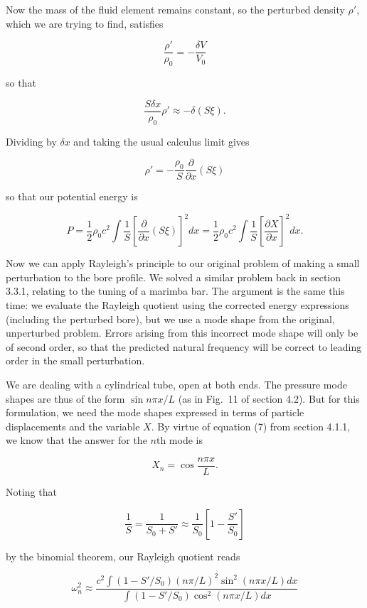   Now the mass of the fluid element remains constant, so the perturbed density 
  $\rho'$, which we are trying to find, satisfies 

  $$\dfrac{\rho'}{\rho_0}=-\dfrac{\delta V}{V_0} \tag{6}$$ 

  so that 

  $$\dfrac{S \delta x}{\rho_0}\rho' \approx -\delta(S \xi) . \tag{7}$$ 

  Dividing by $\delta x$ and taking the usual calculus limit gives 

  $$\rho'=-\dfrac{\rho_0}{S}\dfrac{\partial}{\partial x}(S \xi) \tag{8}$$ 

  so that our potential energy is 

  $$P=\dfrac{1}{2} \rho_0 c^2 \int{\dfrac{1}{S}\left[\dfrac{\partial}{\partial 
  x}(S \xi)\right]^2 dx}=\dfrac{1}{2} \rho_0 c^2 
  \int{\dfrac{1}{S}\left[\dfrac{\partial X}{\partial x}\right]^2 dx} . 
  \tag{9}$$ 

  Now we can apply Rayleigh's principle to our original problem of making a 
  small perturbation to the bore profile. We solved a similar problem back in 
  section 3.3.1, relating to the tuning of a marimba bar. The argument is the 
  same this time: we evaluate the Rayleigh quotient using the corrected energy 
  expressions (including the perturbed bore), but we use a mode shape from the 
  original, unperturbed problem. Errors arising from this incorrect mode shape 
  will only be of second order, so that the predicted natural frequency will be 
  correct to leading order in the small perturbation. 

  We are dealing with a cylindrical tube, open at both ends. The pressure mode 
  shapes are thus of the form $\sin n \pi x/L$ (as in Fig.\ 11 of section 4.2). 
  But for this formulation, we need the mode shapes expressed in terms of 
  particle displacements and the variable $X$. By virtue of equation (7) from 
  section 4.1.1, we know that the answer for the $n\mathrm{th}$ mode is 

  $$X_n=\cos \dfrac{n \pi x}{L} . \tag{10}$$ 

  Noting that 

  $$\dfrac{1}{S}=\dfrac{1}{S_0+S'} \approx 
  \dfrac{1}{S_0}\left[1-\dfrac{S'}{S_0}\right] \tag{11}$$ 

  by the binomial theorem, our Rayleigh quotient reads 

  $$\omega_n^2 \approx \dfrac{c^2 \int{(1-S'/S_0)(n \pi/L)^2 \sin^2(n \pi x/L) 
  dx}}{\int{(1-S'/S_0) \cos^2(n \pi x/L) dx}} \tag{12}$$ 

